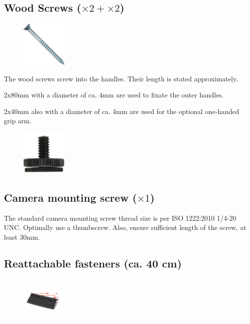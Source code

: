 \subsection{Wood Screws ($\times2+\times2$)}

\begin{figure}
    \vspace{-1.5cm}
    \includegraphics[width=0.2\textwidth]{GenericParts/WoodScrew.jpg}
\end{figure}

The wood screws screw into the handles. Their length is stated approximately.

2x80mm with a diameter of ca. 4mm are used to fixate the outer handles.

2x40mm also with a diameter of ca. 4mm are used for the optional one-handed grip arm.

\begin{figure}
    \vspace{-1.5cm}
    \includegraphics[width=0.2\textwidth]{GenericParts/Thumbscrew.JPG}
\end{figure}

\subsection{Camera mounting screw ($\times1$)}

The standard camera mounting screw thread size is per ISO 1222:2010 1/4-20 UNC. Optimally use a thumbscrew. Also, ensure sufficient length of the screw, at least 30mm.


\subsection{Reattachable fasteners (ca. 40 cm)}

\begin{figure}
    \vspace{-1.5cm}
    \includegraphics[width=0.2\textwidth]{GenericParts/Dual-lock.jpg}
\end{figure}

